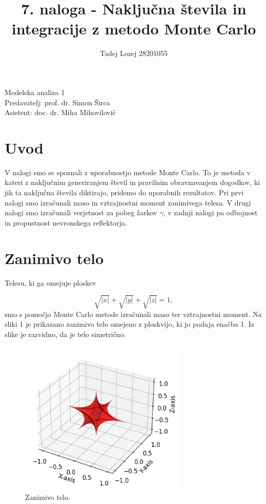 \documentclass[slovene,11pt,a4paper]{article}
\begin{document}
\title{7. naloga - Naključna števila in integracije z metodo Monte Carlo}
\author{Tadej Lozej 28201055}
\maketitle
\begin{center}
Modelska analiza 1 \\
\bigskip
Predavatelj: prof. dr. Simon Širca \\
Asistent: doc. dr. Miha Mihovilovič
\end{center}

\newpage

\tableofcontents

\newpage

\section{Uvod}


V nalogi smo se spoznali z uporabnostjo metode Monte Carlo. To je metoda v kateri z naključnim generiranjem števil in pravilnim obravnavanjem dogodkov, ki jih ta naključna števila diktirajo, pridemo do uporabnih rezultatov. Pri prvi nalogi smo izračunali maso in vztrajnostni moment zanimivega telesa. V drugi nalogi smo izračunali verjetnost za pobeg žarkov $\gamma$, v zadnji nalogi pa odbojnost in propustnost nevronskega reflektorja.

\section{Zanimivo telo}

Telesu, ki ga omejuje ploskev

\begin{equation}
\sqrt{|x|} + \sqrt{|y|} + \sqrt{|z|} = 1,
\end{equation}
smo s pomočjo Monte Carlo metode izračunali maso ter vztrajnostni moment. Na sliki 1 je prikazano zanimivo telo omejeno z ploskvijo, ki jo podaja enačba 1. Iz slike je razvidno, da je telo simetrično.

\begin{figure}[h!]
\centering
\includegraphics[width=8cm]{telo1.png}
\caption{Zanimivo telo.}
\end{figure}
\end{document}
